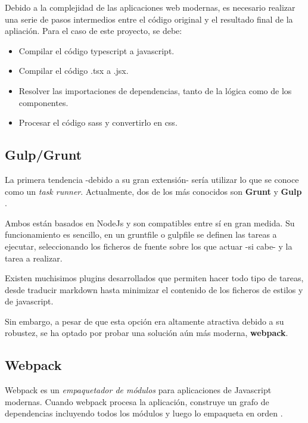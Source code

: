 Debido a la complejidad de las aplicaciones web modernas, es necesario 
realizar una serie de pasos intermedios entre el código original y 
el resultado final de la apliación. Para el caso de este proyecto, se debe:

\begin{itemize}

\item Compilar el código typescript a javascript.

\item Compilar el código .tsx a .jsx.

\item Resolver las importaciones de dependencias, tanto de la lógica
como de los componentes.

\item Procesar el código sass y convertirlo en css.

\end{itemize}

\subsection{Gulp/Grunt}

La primera tendencia -debido a su gran extensión- sería utilizar 
lo que se conoce como un \textit{task runner}. Actualmente, dos de los 
más conocidos son \textbf{Grunt} \cite{grunt} y  \textbf{Gulp} \cite{gulp}.

\bigskip
Ambos están basados en NodeJs y son compatibles entre sí en gran medida.
Su funcionamiento es sencillo, en un gruntfile o gulpfile se definen las tareas a
ejecutar, seleccionando los ficheros de fuente sobre los que actuar -si cabe- y la tarea 
a realizar.

\bigskip
Existen muchisimos plugins desarrollados que permiten hacer todo tipo de tareas, desde traducir
markdown hasta minimizar el contenido de los ficheros de estilos y de javascript.

\bigskip
Sin embargo, a pesar de que esta opción era altamente atractiva debido 
a su robustez, se ha optado por probar una solución aún más moderna, \textbf{webpack}.

\subsection{Webpack}

Webpack es un \textit{empaquetador de módulos} para aplicaciones de Javascript modernas.
Cuando webpack procesa la aplicación, construye un grafo de dependencias
incluyendo todos los módulos y luego lo empaqueta en orden \cite{webpack}.  

